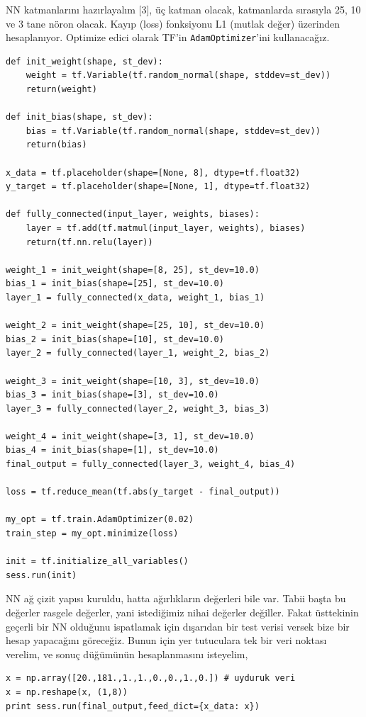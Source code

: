 \documentclass[12pt,fleqn]{article}\usepackage{../../common}
\begin{document}
NN katmanlarını hazırlayalım [3], üç katman olacak, katmanlarda sırasıyla
25, 10 ve 3 tane nöron olacak. Kayıp (loss) fonksiyonu L1 (mutlak değer)
üzerinden hesaplanıyor. Optimize edici olarak TF'in
\verb!AdamOptimizer!'ini kullanacağız.

\begin{verbatim}
def init_weight(shape, st_dev):
    weight = tf.Variable(tf.random_normal(shape, stddev=st_dev))
    return(weight)
    
def init_bias(shape, st_dev):
    bias = tf.Variable(tf.random_normal(shape, stddev=st_dev))
    return(bias)
    
x_data = tf.placeholder(shape=[None, 8], dtype=tf.float32)
y_target = tf.placeholder(shape=[None, 1], dtype=tf.float32)

def fully_connected(input_layer, weights, biases):
    layer = tf.add(tf.matmul(input_layer, weights), biases)
    return(tf.nn.relu(layer))

weight_1 = init_weight(shape=[8, 25], st_dev=10.0)
bias_1 = init_bias(shape=[25], st_dev=10.0)
layer_1 = fully_connected(x_data, weight_1, bias_1)

weight_2 = init_weight(shape=[25, 10], st_dev=10.0)
bias_2 = init_bias(shape=[10], st_dev=10.0)
layer_2 = fully_connected(layer_1, weight_2, bias_2)

weight_3 = init_weight(shape=[10, 3], st_dev=10.0)
bias_3 = init_bias(shape=[3], st_dev=10.0)
layer_3 = fully_connected(layer_2, weight_3, bias_3)

weight_4 = init_weight(shape=[3, 1], st_dev=10.0)
bias_4 = init_bias(shape=[1], st_dev=10.0)
final_output = fully_connected(layer_3, weight_4, bias_4)

loss = tf.reduce_mean(tf.abs(y_target - final_output))

my_opt = tf.train.AdamOptimizer(0.02)
train_step = my_opt.minimize(loss)

init = tf.initialize_all_variables()
sess.run(init)
\end{verbatim}

NN ağ çizit yapısı kuruldu, hatta ağırlıkların değerleri bile var. Tabii
başta bu değerler rasgele değerler, yani istediğimiz nihai değerler
değiller. Fakat üsttekinin geçerli bir NN olduğunu ispatlamak için
dışarıdan bir test verisi versek bize bir hesap yapacağını göreceğiz. Bunun
için yer tutuculara tek bir veri noktası verelim, ve sonuç düğümünün
hesaplanmasını isteyelim,

\begin{verbatim}
x = np.array([20.,181.,1.,1.,0.,0.,1.,0.]) # uyduruk veri
x = np.reshape(x, (1,8))
print sess.run(final_output,feed_dict={x_data: x})
\end{verbatim}
\end{document}
